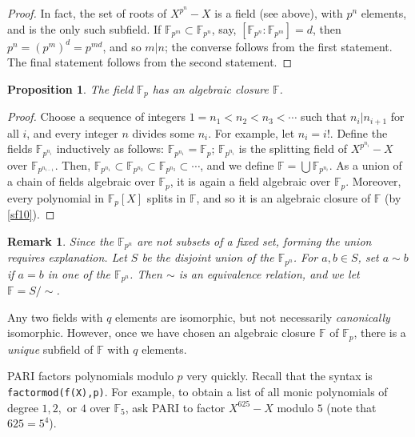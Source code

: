 \documentclass[a4paper,11pt,final,openany]{memoir}
\newtheorem{proposition}[X]{Proposition}
\newtheorem{remark}[X]{Remark}
\theoremstyle{nonumberplain}
\newtheorem{proof}{Proof.}
\begin{document}
\begin{proof}
In fact, the set of roots of $X^{p^{n}}-X$ is a field (see above), with
$p^{n}$ elements, and is the only such subfield. If $\mathbb{F}_{p^{m}}%
\subset\mathbb{F}_{p^{n}}$, say, $[\mathbb{F}{}_{p^{n}}\colon\mathbb{F}%
{}_{p^{m}}]=d$, then $p^{n}=(p^{m})^{d}=p^{md}$, and so $m|n$; the converse
follows from the first statement. The final statement follows from the second statement.
\end{proof}

\begin{proposition}
\label{cg18n}The field $\mathbb{F}{}_{p}$ has an algebraic closure
$\mathbb{F}{}$.
\end{proposition}

\begin{proof}
Choose a sequence of integers $1=n_{1}<n_{2}<n_{3}<\cdots$ such that
$n_{i}|n_{i+1}$ for all $i$, and every integer $n$ divides some $n_{i}$. For
example, let $n_{i}=i!$. Define the fields $\mathbb{F}{}_{p^{n_{i}}}$
inductively as follows: $\mathbb{F}{}_{p^{n_{1}}}=\mathbb{F}{}_{p}$;
$\mathbb{F}{}_{p^{n_{i}}}$ is the splitting field of $X^{p^{n_{i}}}-X$ over
$\mathbb{F}{}_{p^{n_{i-1}}}$. Then, $\mathbb{F}{}_{p^{n_{1}}}\subset
\mathbb{F}{}_{p^{n_{2}}}\subset\mathbb{F}{}_{p^{n_{3}}}\subset\cdots$, and we
define $\mathbb{F}{}=\bigcup\mathbb{F}{}_{p^{n_{i}}}$. As a union of a chain
of fields algebraic over $\mathbb{F}{}_{p}$, it is again a field algebraic
over $\mathbb{F}{}_{p}$. Moreover, every polynomial in $\mathbb{F}{}_{p}[X]$
splits in $\mathbb{F}{}$, and so it is an algebraic closure of $\mathbb{F}{}$
(by \ref{sf10}).
\end{proof}

\begin{remark}
\label{sf13m}Since the $\mathbb{F}{}_{p^{n}}$ are not subsets of a fixed set,
forming the union requires explanation. Let $S$ be the disjoint union of the
$\mathbb{F}{}_{p^{n}}$. For $a,b\in S$, set $a\sim b$ if $a=b$ in one of the
$\mathbb{F}{}_{p^{n}}$. Then $\sim$ is an equivalence relation, and we let
$\mathbb{F}{}=S/\sim$.
\end{remark}

Any two fields with $q$ elements are isomorphic, but not necessarily
\textit{canonically} isomorphic. However, once we have chosen an algebraic
closure $\mathbb{F}{}$ of $\mathbb{F}{}_{p}$, there is a \textit{unique}
subfield of $\mathbb{F}{}$ with $q$ elements.

PARI%
factors polynomials modulo $p$ very quickly. Recall that the syntax is
\newline\texttt{factormod(f(X),p)}. For example, to obtain a list of all monic
polynomials of degree $1,2,$ or $4$ over $\mathbb{F}_{5}$, ask PARI to factor
$X^{625}-X$ modulo $5$ (note that $625=5^{4}$).
\end{document}

